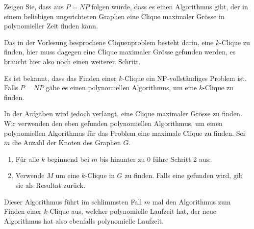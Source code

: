 Zeigen Sie, dass aus $P=NP$ folgen würde, dass es einen Algorithmus
gibt, der in einem beliebigen ungerichteten Graphen eine Clique
maximaler Grösse in polynomieller Zeit finden kann.

\begin{hinweis}
Das in der Vorlesung besprochene Cliquenproblem besteht
darin, eine $k$-Clique zu finden, hier muss dagegen eine Clique maximaler
Grösse gefunden werden, es braucht hier also noch einen weiteren
Schritt.
\end{hinweis}

\begin{loesung}
Es ist bekannt, dass das Finden einer $k$-Clique ein NP-vollständiges
Problem ist. Falls $P=NP$ gäbe es einen polynomiellen Algorithmus, um
eine $k$-Clique zu finden.

In der Aufgaben wird jedoch verlangt, eine Clique maximaler
Grösse zu finden. Wir verwenden den eben gefunden polynomiellen Algorithmus,
um einen polynomiellen Algorithmus für das Problem eine maximale Clique
zu finden.
Sei $m$ die Anzahl der Knoten des Graphen $G$.
\begin{enumerate}
\item Für alle $k$ beginnend bei $m$ bis hinunter zu $0$ führe Schritt 2 aus:
\item Verwende $M$ um eine $k$-Clique in $G$ zu finden. Falls eine
gefunden wird, gib sie als Resultat zurück.
\end{enumerate}
Dieser Algorithmus führt im schlimmsten Fall $m$ mal den Algorithmus zum
Finden einer $k$-Clique aus, welcher polynomielle Laufzeit hat, der neue
Algorithmus hat also ebenfalls polynomielle Laufzeit.
\end{loesung}
